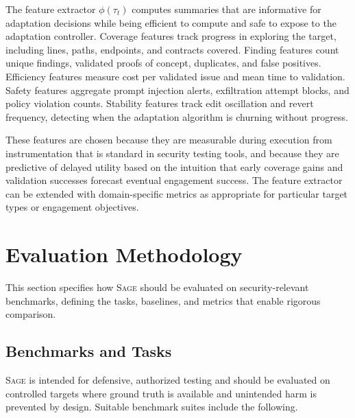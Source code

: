 \documentclass[sigconf,anonymous]{acmart}
\newcommand{\SAGE}{\textsc{Sage}\xspace}
\begin{document}
The feature extractor $\phi(\tau_t)$ computes summaries that are informative for adaptation decisions while being efficient to compute and safe to expose to the adaptation controller. Coverage features track progress in exploring the target, including lines, paths, endpoints, and contracts covered. Finding features count unique findings, validated proofs of concept, duplicates, and false positives. Efficiency features measure cost per validated issue and mean time to validation. Safety features aggregate prompt injection alerts, exfiltration attempt blocks, and policy violation counts. Stability features track edit oscillation and revert frequency, detecting when the adaptation algorithm is churning without progress.

These features are chosen because they are measurable during execution from instrumentation that is standard in security testing tools, and because they are predictive of delayed utility based on the intuition that early coverage gains and validation successes forecast eventual engagement success. The feature extractor can be extended with domain-specific metrics as appropriate for particular target types or engagement objectives.

\section{Evaluation Methodology}
\label{sec:evaluation}

This section specifies how \SAGE should be evaluated on security-relevant benchmarks, defining the tasks, baselines, and metrics that enable rigorous comparison.

\subsection{Benchmarks and Tasks}

\SAGE is intended for defensive, authorized testing and should be evaluated on controlled targets where ground truth is available and unintended harm is prevented by design. Suitable benchmark suites include the following.
\end{document}
